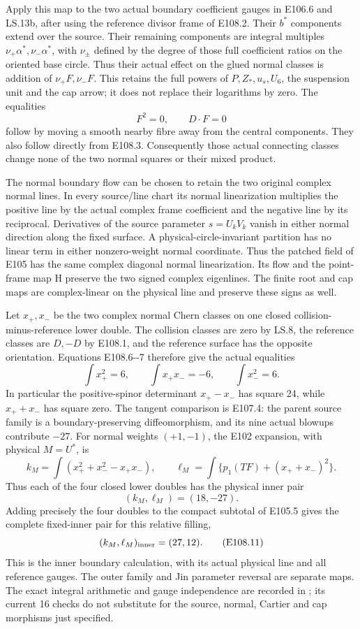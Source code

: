 Apply this map to the two actual boundary coefficient gauges in E106.6 and LS.13b, after using the reference divisor frame of E108.2. Their \(b^*\) components extend over the source. Their remaining components are integral multiples \(\nu_+\alpha^*,\nu_-\alpha^*\), with \(\nu_\pm\) defined by the degree of those full coefficient ratios on the oriented base circle. Thus their actual effect on the glued normal classes is addition of \(\nu_+F,\nu_-F\). This retains the full powers of \(P,Z_*,u_s,U_6\), the suspension unit and the cap arrow; it does not replace their logarithms by zero. The equalities
\[
                        F^2=0,\qquad D\cdot F=0
 \tag{E108.7}
\]
follow by moving a smooth nearby fibre away from the central components. They also follow directly from E108.3. Consequently those actual connecting classes change none of the two normal squares or their mixed product.

The normal boundary flow can be chosen to retain the two original complex normal lines. In every source/line chart its normal linearization multiplies the positive line by the actual complex frame coefficient and the negative line by its reciprocal. Derivatives of the source parameter \(s=U_kV_k\) vanish in either normal direction along the fixed surface. A physical-circle-invariant partition has no linear term in either nonzero-weight normal coordinate. Thus the patched field of E105 has the same complex diagonal normal linearization. Its flow and the point-frame map H preserve the two signed complex eigenlines. The finite root and cap maps are complex-linear on the physical line and preserve these signs as well.

Let \(x_+,x_-\) be the two complex normal Chern classes on one closed collision-minus-reference lower double. The collision classes are zero by LS.8, the reference classes are \(D,-D\) by E108.1, and the reference surface has the opposite orientation. Equations E108.6-\/-7 therefore give the actual equalities
\[
 \int x_+^2=6,\qquad \int x_+x_-=-6,\qquad
 \int x_-^2=6.
 \tag{E108.8}
\]
In particular the positive-spinor determinant \(x_+-x_-\) has square 24, while \(x_++x_-\) has square zero. The tangent comparison is E107.4: the parent source family is a boundary-preserving diffeomorphism, and its nine actual blowups contribute \(-27\). For normal weights \((+1,-1)\), the E102 expansion, with physical \(M=U^*\), is
\[
 k_M=\int(x_+^2+x_-^2-x_+x_-),\qquad
 \ell_M=\int\{p_1(TF)+(x_++x_-)^2\}.
 \tag{E108.9}
\]
Thus each of the four closed lower doubles has the physical inner pair
\[
                             (k_M,\ell_M)=(18,-27).
 \tag{E108.10}
\]
Adding precisely the four doubles to the compact subtotal of E105.5 gives the complete fixed-inner pair for this relative filling,
\[
                         (k_M,\ell_M)_{\rm inner}=(27,12).
 \tag{E108.11}
\]
This is the inner boundary calculation, with its actual physical line and all reference gauges. The outer family and Jin parameter reversal are separate maps. The exact integral arithmetic and gauge independence are recorded in ; its current 16 checks do not substitute for the source, normal, Cartier and cap morphisms just specified.

